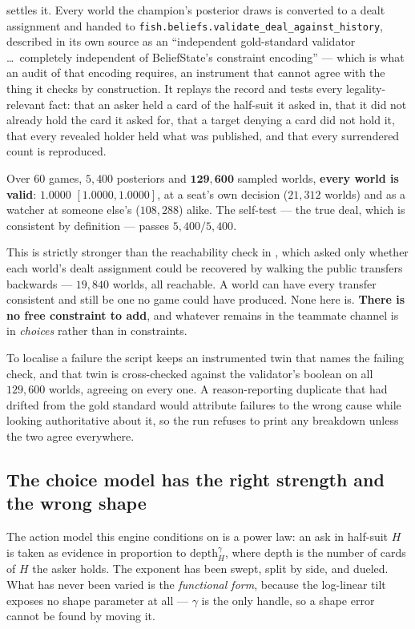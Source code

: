 \documentclass[11pt,letterpaper]{article}
\begin{document}
 settles it. Every world the champion's
posterior draws is converted to a dealt assignment and handed to
\texttt{fish.beliefs.validate\_deal\_against\_history}, described in its own
source as an ``independent gold-standard validator \ldots\ completely
independent of BeliefState's constraint encoding'' --- which is what an audit of
that encoding requires, an instrument that cannot agree with the thing it
checks by construction. It replays the record and tests every
legality-relevant fact: that an asker held a card of the half-suit it asked in,
that it did not already hold the card it asked for, that a target denying a card
did not hold it, that every revealed holder held what was published, and that
every surrendered count is reproduced.

Over $60$ games, $5{,}400$ posteriors and $\mathbf{129{,}600}$ sampled worlds,
\textbf{every world is valid}: $1.0000$ $[1.0000, 1.0000]$, at a seat's own
decision ($21{,}312$ worlds) and as a watcher at someone else's ($108{,}288$)
alike. The self-test --- the true deal, which is consistent by definition ---
passes $5{,}400/5{,}400$.

This is strictly stronger than the reachability check in
, which asked only whether each world's
dealt assignment could be recovered by walking the public transfers backwards
--- $19{,}840$ worlds, all reachable. A
world can have every transfer consistent and still be one no game could have
produced. None here is. \textbf{There is no free constraint to add}, and
whatever remains in the teammate channel is in \emph{choices} rather than in
constraints.

To localise a failure the script keeps an instrumented twin that names the
failing check, and that twin is cross-checked against the validator's boolean on
all $129{,}600$ worlds, agreeing on every one. A reason-reporting duplicate that
had drifted from the gold standard would attribute failures to the wrong cause
while looking authoritative about it, so the run refuses to print any breakdown
unless the two agree everywhere.

\subsection{The choice model has the right strength and the wrong shape}
\label{sec:res-profile}
The action model this engine conditions on is a power law: an ask in half-suit
$H$ is taken as evidence in proportion to $\mathrm{depth}_H^{\gamma}$, where
depth is the number of cards of $H$ the asker holds. The exponent has been
swept, split by side, and dueled. What has never been varied is the
\emph{functional form}, because the log-linear tilt exposes no shape parameter
at all --- $\gamma$ is the only handle, so a shape error cannot be found by
moving it.
\end{document}
